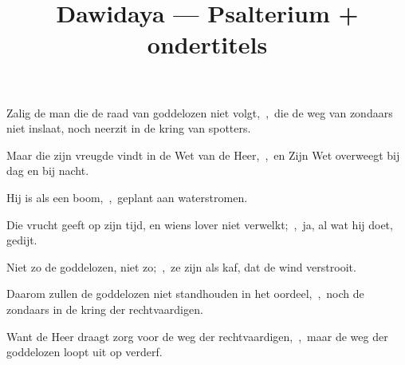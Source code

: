\documentclass[12pt,twoside,a5paper]{article}
\begin{document}
\title{Dawidaya --- Psalterium + ondertitels}
\author{}
\date{}
\maketitle







\begin{halfparskip}
  Zalig de man die de raad van goddelozen niet volgt,~\sep\ die de weg van zondaars niet inslaat, noch neerzit in de kring van spotters.


  Maar die zijn vreugde vindt in de Wet van de Heer,~\sep\ en Zijn Wet overweegt bij dag en bij nacht.

  Hij is als een boom,~\sep\ geplant aan waterstromen.

  Die vrucht geeft op zijn tijd, en wiens lover niet verwelkt;~\sep\ ja, al wat hij doet, gedijt.
\end{halfparskip}


\begin{halfparskip}
  Niet zo de goddelozen, niet zo;~\sep\ ze zijn als kaf, dat de wind verstrooit.

  Daarom zullen de goddelozen niet standhouden in het oordeel,~\sep\ noch de zondaars in de kring der rechtvaardigen.

  Want de Heer draagt zorg voor de weg der rechtvaardigen,~\sep\ maar de weg der goddelozen loopt uit op verderf.
\end{halfparskip}


\end{document}
